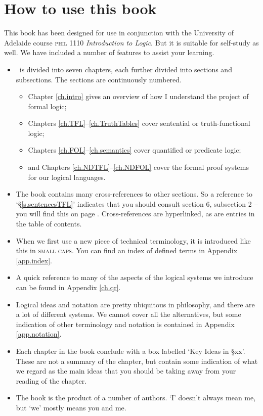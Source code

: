 \documentclass[twoside, openany, 11pt, a4paper]{memoir}
\begin{document}
\renewcommand{\partname}{Chapter} %

\pagestyle{forallxpage}


\frontmatter


\newpage
\tableofcontents*

\chapter*{How to use this book}

This book has been designed for use in conjunction with the University of Adelaide course \textsc{phil} 1110 \emph{Introduction to Logic}. But it is suitable for self-study as well. We have included a number of features to assist your learning. \begin{itemize}
	\item \forallx\ is divided into seven chapters, each further divided into sections and subsections. The sections are continuously numbered. \begin{itemize}
		\item Chapter \ref{ch.intro} gives an overview of how I understand the project of formal logic;
		\item Chapters \ref{ch.TFL}–\ref{ch.TruthTables} cover sentential or truth-functional logic;
		\item Chapters \ref{ch.FOL}–\ref{ch.semantics} cover quantified or predicate logic;
		\item and Chapters \ref{ch.NDTFL}–\ref{ch.NDFOL} cover the formal proof systems for our logical languages.
	\end{itemize}
	\item The book contains many cross-references to other sections. So a reference to `§\ref{s.sentencesTFL}' indicates that you should consult section 6, subsection 2 – you will find this on page \pageref{s.sentencesTFL}. Cross-references are hyperlinked, as are entries in the table of contents.
	\item When we first use a new piece of technical terminology, it is introduced like this in \textsc{small caps}. You can find an index of defined terms in Appendix \ref{app.index}.
	\item A quick reference to many of the aspects of the logical systems we introduce can be found in Appendix \ref{ch.qr}.
	\item Logical ideas and notation are pretty ubiquitous in philosophy, and there are a lot of different systems. We cannot cover all the alternatives, but some indication of other terminology and notation is contained in Appendix \ref{app.notation}.
	\item Each chapter in the book conclude with a box labelled `Key Ideas in §xx'. These are not a summary of the chapter, but contain some indication of what we regard as the main ideas that you should be taking away from your reading of the chapter. 
	\item The book is the product of a number of authors. `I' doesn't always mean me, but `we' mostly means you and me.
\end{itemize}
\end{document}

